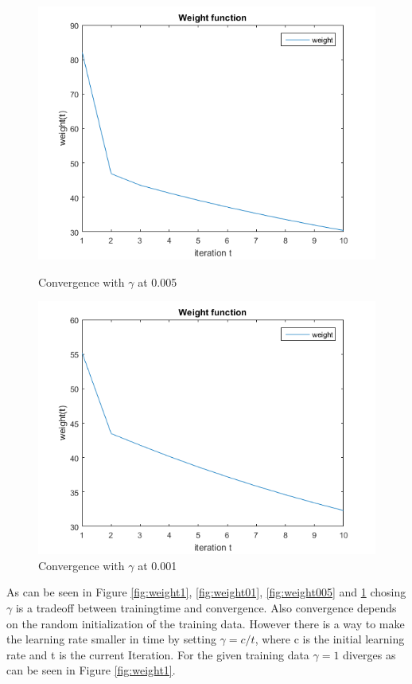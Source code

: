 \begin{figure}[!ht]
	\begin{minipage}{0.5 \textwidth}
		\centering
		\includegraphics[width=1\textwidth]{img/WeightFunction005}
		\caption{Convergence with $\gamma$ at 0.005}
		\label{fig:weight005}
	\end{minipage}
	\begin{minipage}{0.5 \textwidth}
		\centering
		\includegraphics[width=1\textwidth]{img/WeightFunction001}
		\caption{Convergence with $\gamma$ at 0.001}
		\label{fig:weight001}
	\end{minipage}
\end{figure}

As can be seen in Figure \ref{fig:weight1}, \ref{fig:weight01}, \ref{fig:weight005} and \ref{fig:weight001} chosing $\gamma$ is a tradeoff between trainingtime and convergence. Also convergence depends on the random initialization of the training data. However there is a way to make the learning rate smaller in time by setting $\gamma = c/t$, where c is the initial learning rate and t is the current Iteration. For the given training data $\gamma = 1$ diverges as can be seen in Figure \ref{fig:weight1}.






